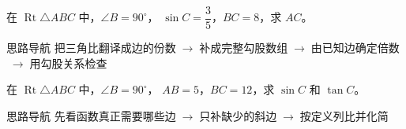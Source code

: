 \documentclass{exam-zh}
\begin{document}
\begin{eduProblemBlock}[例题 1：三角比求线段]
在 $\operatorname{Rt}\triangle ABC$ 中，$\angle B=90^\circ$，
$\sin C=\dfrac35$，$BC=8$，求 $AC$。

\end{eduProblemBlock}





\begin{eduAuxItem}{思路导航}
把三角比翻译成边的份数$\;\to\;$补成完整勾股数组$\;\to\;$由已知边确定倍数$\;\to\;$用勾股关系检查\end{eduAuxItem}





\begin{eduDualExplain}
  \begin{eduExplainLeft}
  \end{eduExplainLeft}

  \begin{eduExplainRight}
      
      
      
      
  \end{eduExplainRight}
\end{eduDualExplain}




\begin{eduProblemBlock}[例题 2：线段求三角比]
在 $\operatorname{Rt}\triangle ABC$ 中，$\angle B=90^\circ$，
$AB=5$，$BC=12$，求 $\sin C$ 和 $\tan C$。

\end{eduProblemBlock}





\begin{eduAuxItem}{思路导航}
先看函数真正需要哪些边$\;\to\;$只补缺少的斜边$\;\to\;$按定义列比并化简\end{eduAuxItem}
\end{document}
